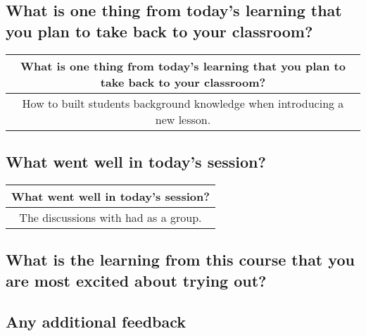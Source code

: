 \documentclass[10,a4paperpaper,]{article}
\begin{document}
\subsection{What is one thing from today's learning that you plan to take back to your classroom?}

\captionsetup[table]{labelformat=empty,skip=1pt}
\begin{longtable}{c}
\toprule
What is one thing from today's learning that you plan to take back to your classroom? \\ 
\midrule
How to built students\textquotesingle{} background knowledge when introducing a new lesson. \\ 
\bottomrule
\end{longtable}

\subsection{What went well in today's session?}

\captionsetup[table]{labelformat=empty,skip=1pt}
\begin{longtable}{c}
\toprule
What went well in today’s session? \\ 
\midrule
The discussions with had as a group. \\ 
\bottomrule
\end{longtable}

\subsection{What is the learning from this course that you are most excited about trying out?}

\subsection{Any additional feedback}
\end{document}
